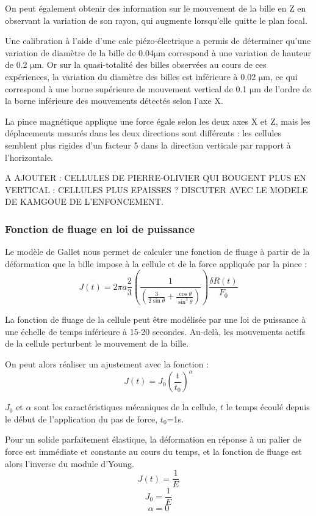 \documentclass{report}
\newcommand{\micro}{$\mathrm{\mu}$}
\begin{document}
On peut également obtenir des information sur le mouvement de la bille en Z en observant la variation de son rayon, qui augmente lorsqu'elle quitte le plan focal. 

Une calibration à l'aide d'une cale piézo-électrique a permis de déterminer qu'une variation de diamètre de la bille de 0.04\micro m correspond à une variation de hauteur de 0.2 \micro m. 
Or sur la quasi-totalité des billes observées au cours de ces expériences, la variation du diamètre des billes est inférieure à 0.02 \micro m, ce qui correspond à une borne supérieure de mouvement vertical de 0.1 \micro m de l'ordre de la borne inférieure des mouvements détectés selon l'axe X. 

La pince magnétique applique une force égale selon les deux axes X et Z, mais les déplacements mesurés dans les deux directions sont différents : les cellules semblent plus rigides d'un facteur 5 dans la direction verticale par rapport à l'horizontale. 

A AJOUTER : CELLULES DE PIERRE-OLIVIER QUI BOUGENT PLUS EN VERTICAL : CELLULES PLUS EPAISSES ? DISCUTER AVEC LE MODELE DE KAMGOUE DE L'ENFONCEMENT. 
\subsubsection{Fonction de fluage en loi de puissance}

Le modèle de Gallet nous permet de calculer une fonction de fluage à partir de la déformation que la bille impose à la cellule et de la force appliquée par la pince : 
\begin{equation}
	J(t)=2\pi a \frac{2}{3}\left(\frac{1}{\left( \frac{3}{2 \sin \theta}+\frac{\cos \theta}{\sin^3 \theta}\right)} \right)  \frac{\delta R(t)}{F_0}
	\end{equation}
	
	
La fonction de fluage de la cellule peut être modélisée par une loi de puissance à une échelle de temps inférieure à 15-20 secondes. Au-delà, les mouvements actifs de la cellule perturbent le mouvement de la bille. 

On peut alors réaliser un ajustement avec la fonction : 
$$ J(t)=J_0 \left( \frac{t}{t_0} \right)^{\alpha}$$

$J_0$ et $\alpha$ sont les caractéristiques mécaniques de la cellule, $t$ le temps écoulé depuis le début de l'application du pas de force, $t_0$=1s. 

Pour un solide parfaitement élastique, la déformation en réponse à un palier de force est immédiate et constante au cours du temps, et la fonction de fluage est alors l'inverse du module d'Young.
$$J(t)=\frac{1}{E}$$
 $$J_0=\frac{1}{E} $$
 $$\alpha=0$$
 
\end{document}
